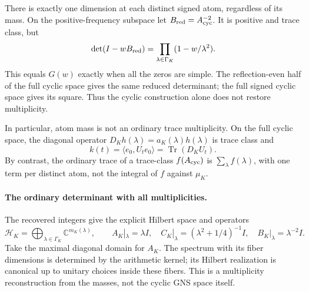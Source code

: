 \documentclass[11pt,a4paper]{article}
\newcommand{\Tr}{\operatorname{Tr}}
\newcommand{\C}{\mathbb C}
\begin{document}
There is exactly one dimension at each distinct signed atom,
regardless of its mass. On the positive-frequency subspace let
\(B_{\rm red}=A_{\rm cyc}^{-2}\). It is positive and trace class, but
\[
 \det(I-wB_{\rm red})
 =\prod_{\lambda\in\Gamma_K}(1-w/\lambda^2).
\]
This equals \(G(w)\) exactly when all the zeros are simple.
The reflection-even half of the full cyclic space gives the same
reduced determinant; the full signed cyclic space gives its square.
Thus the cyclic construction alone does not restore multiplicity.

In particular, atom mass is not an ordinary trace multiplicity.
On the full cyclic space, the diagonal operator
\(D_Kh(\lambda)=a_K(\lambda)h(\lambda)\) is trace class and
\[
 k(t)=\langle e_0,U_te_0\rangle
     =\Tr(D_KU_t).
\]
By contrast, the ordinary trace of a trace-class \(f(A_{\rm cyc})\)
is \(\sum_{\lambda}f(\lambda)\), with one term per distinct atom,
not the integral of \(f\) against \(\mu_K\).

\paragraph{The ordinary determinant with all multiplicities.}
The recovered integers give the explicit Hilbert space and operators
\[
 \mathcal H_K=\bigoplus_{\lambda\in\Gamma_K}\C^{m_K(\lambda)},
 \qquad A_K|_\lambda=\lambda I,\quad
 C_K|_\lambda=(\lambda^2+1/4)^{-1}I,\quad
 B_K|_\lambda=\lambda^{-2}I.
\]
Take the maximal diagonal domain for \(A_K\). The spectrum with its
fiber dimensions is determined by the arithmetic kernel; its Hilbert
realization is canonical up to unitary choices inside these fibers.
This is a multiplicity reconstruction from the masses, not the cyclic
GNS space itself.
\end{document}
